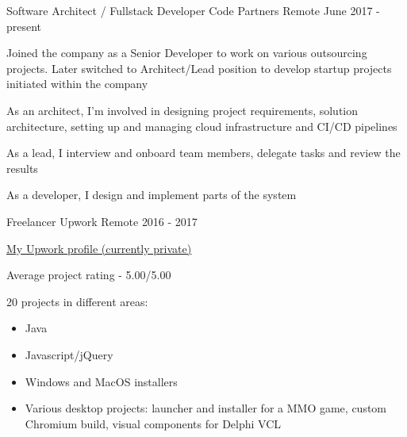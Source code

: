 

\begin{cventries}

  \cventry
  {Software Architect / Fullstack Developer} %
  {Code Partners} %
  {Remote} %
  {June 2017 - present} %
  {
    \begin{cvitems} %
      \item Joined the company as a Senior Developer to work on various outsourcing projects. Later switched to Architect/Lead position to develop startup projects initiated within the company
      \item As an architect, I'm involved in designing project requirements, solution architecture, setting up and managing cloud infrastructure and CI/CD pipelines
      \item As a lead, I interview and onboard team members, delegate tasks and review the results
      \item As a developer, I design and implement parts of the system
    \end{cvitems}
  }

  \cventry
    {Freelancer} %
    {Upwork} %
    {Remote} %
    {2016 - 2017} %
    {
      \begin{cvitems} %
        \item {\color{awesome-skyblue}\href{https://www.upwork.com/freelancers/~01fe466a51a96a2b6a}{\underline{My Upwork profile (currently private)}}}
        \item {Average project rating - 5.00/5.00}
        \item {
        	20 projects in different areas:
            \begin{itemize}[label={•},leftmargin=10pt]
				\item Java
				\item Javascript/jQuery
				\item Windows and MacOS installers
            	\item Various desktop projects: launcher and installer for a MMO game, custom Chromium build, visual components for Delphi VCL
			\end{itemize}
        }
      \end{cvitems}
    }


\end{cventries}
